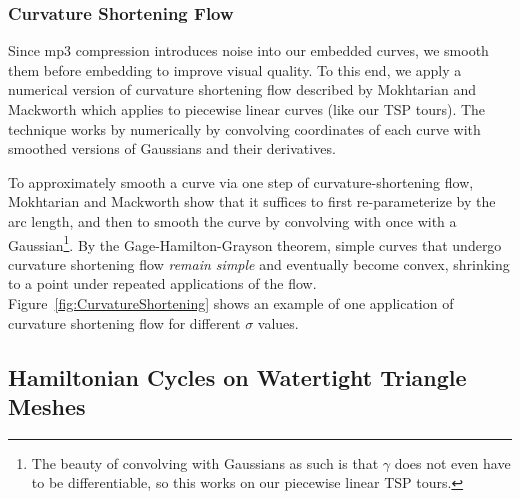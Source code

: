 \documentclass[runningheads]{llncs}
\begin{document}
\subsubsection{Curvature Shortening Flow}




Since mp3 compression introduces noise into our embedded curves, we smooth them before embedding to improve visual quality.  To this end, we apply a numerical version of curvature shortening flow described by Mokhtarian and Mackworth \cite{mokhtarian1992theory} which applies to piecewise linear curves (like our TSP tours).  The technique works by numerically by convolving coordinates of each curve with smoothed versions of Gaussians and their derivatives.  

To approximately smooth a curve via one step of curvature-shortening flow, Mokhtarian and Mackworth \cite{mokhtarian1992theory} show that it suffices to first re-parameterize by the arc length, and then to smooth the curve by convolving with once with a Gaussian\footnote{The beauty of convolving with Gaussians as such is that $\gamma$ does not even have to be differentiable, so this works on our piecewise linear TSP tours.}.  By the Gage-Hamilton-Grayson theorem, simple curves that undergo curvature shortening flow {\em remain simple} and eventually become convex, shrinking to a point under repeated applications of the flow.  Figure~\ref{fig:CurvatureShortening} shows an example of one application of curvature shortening flow for different $\sigma$ values.



\subsection{Hamiltonian Cycles on Watertight Triangle Meshes}
\label{sec:hamiltonian}
\end{document}

